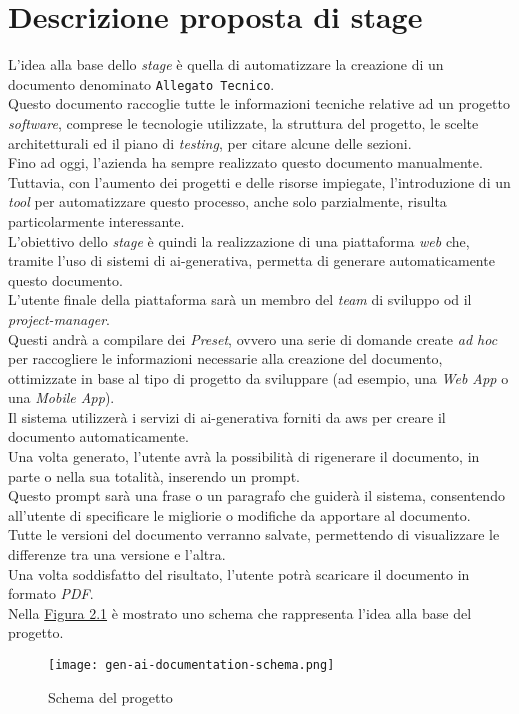 \section{Descrizione proposta di stage}
\label{sez:descrizione-stage}

L'idea alla base dello \textit{stage} è quella di automatizzare la creazione di un documento denominato \texttt{Allegato Tecnico}.\\  
Questo documento raccoglie tutte le informazioni tecniche relative ad un progetto \textit{software}, comprese le tecnologie utilizzate,
la struttura del progetto, le scelte architetturali ed il piano di \textit{testing}, per citare alcune delle sezioni.\\  
Fino ad oggi, l'azienda ha sempre realizzato questo documento manualmente.\\
Tuttavia, con l'aumento dei progetti e delle risorse impiegate,
l'introduzione di un \textit{tool} per automatizzare questo processo, anche solo parzialmente, risulta particolarmente interessante.\\  

\noindent L'obiettivo dello \textit{stage} è quindi la realizzazione di una piattaforma \textit{web} che, tramite l'uso di sistemi di \gls{ai-generativa},  
permetta di generare automaticamente questo documento.\\  
L'utente finale della piattaforma sarà un membro del \textit{team} di sviluppo od il \textit{project-manager}.\\  
Questi andrà a compilare dei \textit{Preset}, ovvero una serie di domande create \textit{ad hoc}
per raccogliere le informazioni necessarie alla creazione del documento, ottimizzate in base al tipo di progetto da sviluppare (ad esempio, una \textit{Web App} o una \textit{Mobile App}).\\  
Il sistema utilizzerà i servizi di \gls{ai-generativa} forniti da \gls{aws} per creare il documento automaticamente.\\  

\noindent Una volta generato, l'utente avrà la possibilità di rigenerare il documento, in parte o nella sua totalità, inserendo un \gls{prompt}.\\  
Questo \gls{prompt} sarà una frase o un paragrafo che guiderà il sistema, consentendo all'utente di specificare le migliorie o modifiche da apportare al documento.\\  
Tutte le versioni del documento verranno salvate, permettendo di visualizzare le differenze tra una versione e l'altra.\\  
Una volta soddisfatto del risultato, l'utente potrà scaricare il documento in formato \textit{PDF}.\\  
Nella {\hyperref[fig:project-schema]{Figura 2.1}} è mostrato uno schema che rappresenta l'idea alla base del progetto.\\  


\begin{figure}[H]
    \label{fig:project-schema}
    \centering
    \texttt{[image: gen-ai-documentation-schema.png]}
    \caption{Schema del progetto}
\end{figure}